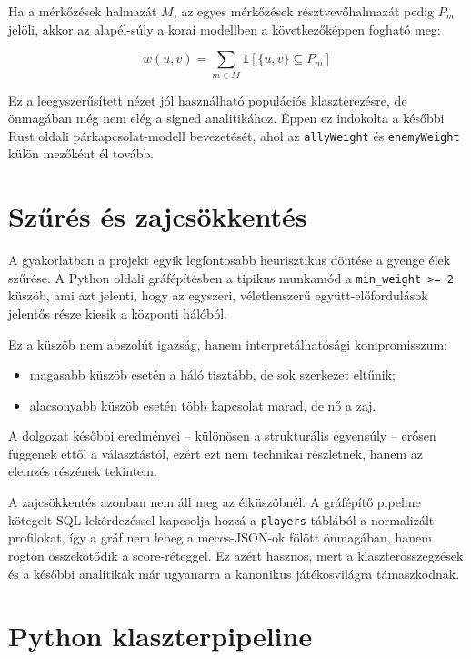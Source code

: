 \documentclass[a4paper,12pt]{report}
\begin{document}
Ha a mérkőzések halmazát $M$, az egyes mérkőzések résztvevőhalmazát pedig $P_m$ jelöli, akkor az alapél-súly a korai modellben a következőképpen fogható meg:

\begin{equation}
w(u,v)=\sum_{m \in M}\mathbf{1}[\{u,v\}\subseteq P_m]
\end{equation}

Ez a leegyszerűsített nézet jól használható populációs klaszterezésre, de önmagában még nem elég a signed analitikához. Éppen ez indokolta a későbbi Rust oldali párkapcsolat-modell bevezetését, ahol az \texttt{allyWeight} és \texttt{enemyWeight} külön mezőként él tovább.

\section{Szűrés és zajcsökkentés}

A gyakorlatban a projekt egyik legfontosabb heurisztikus döntése a gyenge élek szűrése. A Python oldali gráfépítésben a tipikus munkamód a \texttt{min\_weight >= 2} küszöb, ami azt jelenti, hogy az egyszeri, véletlenszerű együtt-előfordulások jelentős része kiesik a központi hálóból.

Ez a küszöb nem abszolút igazság, hanem interpretálhatósági kompromisszum:

\begin{itemize}
    \item magasabb küszöb esetén a háló tisztább, de sok szerkezet eltűnik;
    \item alacsonyabb küszöb esetén több kapcsolat marad, de nő a zaj.
\end{itemize}

A dolgozat későbbi eredményei -- különösen a strukturális egyensúly -- erősen függenek ettől a választástól, ezért ezt nem technikai részletnek, hanem az elemzés részének tekintem.

A zajcsökkentés azonban nem áll meg az élküszöbnél. A gráfépítő pipeline kötegelt SQL-lekérdezéssel kapcsolja hozzá a \texttt{players} táblából a normalizált profilokat, így a gráf nem lebeg a meccs-JSON-ok fölött önmagában, hanem rögtön összekötődik a score-réteggel. Ez azért hasznos, mert a klaszterösszegzések és a későbbi analitikák már ugyanarra a kanonikus játékosvilágra támaszkodnak.

\section{Python klaszterpipeline}
\end{document}
